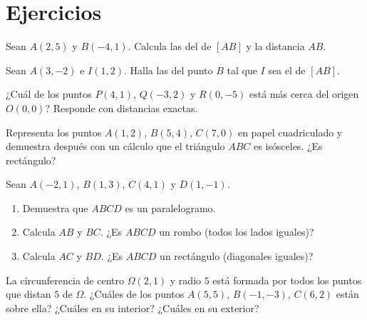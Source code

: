 \section{Ejercicios}

\begin{exercise}[$\star$]\label{exo:g10:coordgeom:1}
Sean $A(2, 5)$ y $B(-4, 1)$. Calcula las  del  de
$[AB]$ y la distancia $AB$.
\end{exercise}

\begin{exercise}[$\star$]\label{exo:g10:coordgeom:2}
Sean $A(3, -2)$ e $I(1, 2)$. Halla las  del punto $B$ tal que
$I$ sea el  de $[AB]$.
\end{exercise}

\begin{exercise}[$\star$]\label{exo:g10:coordgeom:3}
¿Cuál de los puntos $P(4, 1)$, $Q(-3, 2)$ y $R(0, -5)$ está más cerca del
origen $O(0,0)$? Responde con distancias exactas.
\end{exercise}

\begin{exercise}[$\star$]\label{exo:g10:coordgeom:4}
Representa los puntos $A(1, 2)$, $B(5, 4)$, $C(7, 0)$ en papel
cuadriculado y demuestra después con un cálculo que el triángulo $ABC$ es
isósceles. ¿Es rectángulo?
\end{exercise}

\begin{exercise}[$\star\star$]\label{exo:g10:coordgeom:5}
Sean $A(-2, 1)$, $B(1, 3)$, $C(4, 1)$ y $D(1, -1)$.
\begin{enumerate}
  \item Demuestra que $ABCD$ es un paralelogramo.
  \item Calcula $AB$ y $BC$. ¿Es $ABCD$ un rombo (todos los lados
        iguales)?
  \item Calcula $AC$ y $BD$. ¿Es $ABCD$ un rectángulo (diagonales
        iguales)?
\end{enumerate}
\end{exercise}

\begin{exercise}[$\star\star$]\label{exo:g10:coordgeom:6}
La circunferencia de centro $\Omega(2, 1)$ y radio $5$ está formada por
todos los puntos que distan $5$ de $\Omega$. ¿Cuáles de los puntos
$A(5, 5)$, $B(-1, -3)$, $C(6, 2)$ están sobre ella? ¿Cuáles en su
interior? ¿Cuáles en su exterior?
\end{exercise}


